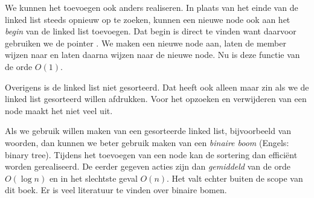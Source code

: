 We kunnen het toevoegen ook anders realiseren. In plaats van het einde van de linked list steeds opnieuw op te zoeken, kunnen een nieuwe node ook aan het \textsl{begin} van de linked list toevoegen. Dat begin is direct te vinden want daarvoor gebruiken we de pointer . We maken een nieuwe node aan, laten de member  wijzen naar  en laten daarna  wijzen naar de nieuwe node. Nu is deze functie van de orde $O(1)$.

Overigens is de linked list niet gesorteerd. Dat heeft ook alleen maar zin als we de linked list gesorteerd willen afdrukken. Voor het opzoeken en verwijderen van een node maakt het niet veel uit.

Als we gebruik willen maken van een gesorteerde linked list, bijvoorbeeld van woorden, dan kunnen we beter gebruik maken van een \textsl{binaire boom} (Engels: binary tree). Tijdens het toevoegen van een node kan de sortering dan efficiënt worden gerealiseerd. De eerder gegeven acties zijn dan \textsl{gemiddeld} van de orde $O(\log n)$ en in het slechtste geval $O(n)$. Het valt echter buiten de scope van dit boek. Er is veel literatuur te vinden over binaire bomen. 